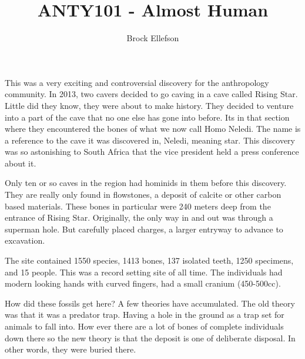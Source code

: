 \documentclass[10pt,a4paper]{report}
\author{Brock Ellefson}
\title{ANTY101 - Almost Human}
\begin{document}
\maketitle
\doublespacing



This was a very exciting and controversial discovery for the anthropology community. In 2013, two cavers decided to go caving in a cave called Rising Star. Little did they know, they were about to make history. They decided to venture into a part of the cave that no one else has gone into before. Its in that section where they encountered the bones of what we now call Homo Neledi. The name is a reference to the cave it was discovered in, Neledi, meaning star. This discovery was so astonishing to South Africa that the vice president held a press conference about it. 


Only ten or so caves in the region had hominids in them before this discovery. They are really only found in flowstones, a deposit of calcite or other carbon based materials. These bones in particular were 240 meters deep from the entrance of Rising Star. Originally, the only way in and out was through a superman hole. But carefully placed charges, a larger entryway to advance to excavation. 


The site contained 1550 species, 1413 bones, 137 isolated teeth, 1250 specimens, and 15 people. This was a record setting site of all time. The individuals had modern looking hands with curved fingers, had a small cranium (450-500cc).


How did these fossils get here? A few theories have accumulated. The old theory was that it was a predator trap. Having a hole in the ground as a trap set for animals to fall into. How ever there are a lot of bones of complete individuals down there so the new theory is that the deposit is one of deliberate disposal. In other words, they were buried there.
\end{document}
